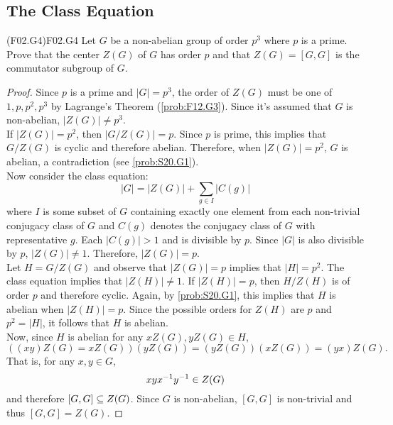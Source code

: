 \documentclass[../../AlgebraQualSolutions.tex]{subfiles}
\begin{document}
\subsection{The Class Equation}

\begin{prob}{(F02.G4)}{F02.G4}
    Let $G$ be a non-abelian group of order $p^3$ where $p$ is a prime. Prove that the center $Z(G)$ of $G$ has order $p$ and that $Z(G) = [G,G]$ is the commutator subgroup of $G$.
\end{prob}

\begin{proof}
    Since $p$ is a prime and $|G| = p^3$, the order of $Z(G)$ must be one of $1,p,p^2,p^3$ by Lagrange's Theorem (\ref{prob:F12.G3}). Since it's assumed that $G$ is non-abelian, $|Z(G)|\neq p^3$.\\

    If $|Z(G)| = p^2$, then $|G/Z(G)| = p$. Since $p$ is prime, this implies that $G/Z(G)$ is cyclic and therefore abelian. Therefore, when $|Z(G)| = p^2$, $G$ is abelian, a contradiction (see \ref{prob:S20.G1}).\\

    Now consider the class equation: 
        \[|G| = |Z(G)| + \sum_{g \in I}|C(g)|\]
    where $I$ is some subset of $G$ containing exactly one element from each non-trivial conjugacy class of $G$ and $C(g)$ denotes the conjugacy class of $G$ with representative $g$. Each $|C(g)|> 1$ and is divisible by $p$. Since $|G|$ is also divisible by $p$, $|Z(G)| \neq 1$. Therefore, $|Z(G)| = p$.\\

    Let $H = G/Z(G)$ and observe that $|Z(G)| = p$ implies that $|H| = p^2$. The class equation implies that $|Z(H)| \neq 1$. If $|Z(H)| = p$, then $H/Z(H)$ is of order $p$ and therefore cyclic. Again, by \ref{prob:S20.G1}, this implies that $H$ is abelian when $|Z(H)| = p$. Since the possible orders for $Z(H)$ are $p$ and $p^2 = |H|$, it follows that $H$ is abelian.\\

    Now, since $H$ is abelian for any $xZ(G),yZ(G) \in H$,
        \[((xy)Z(G) = xZ(G))(yZ(G)) = (yZ(G))(xZ(G)) = (yx)Z(G).\]
    That is, for any $x,y \in G$,
        \[xyx^{-1} y^{-1} \in Z(G)\]
    and therefore $[G,G] \subseteq Z(G)$. Since $G$ is non-abelian, $[G,G]$ is non-trivial and thus $[G,G] = Z(G)$.
\end{proof}
\end{document}
